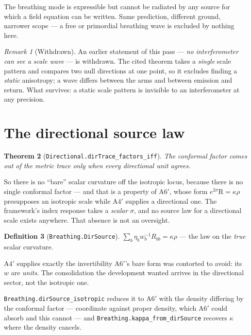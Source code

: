 \documentclass[11pt,a4paper]{article}
\newtheorem{theorem}{Theorem}[section]
\theoremstyle{definition}
\newtheorem{definition}[theorem]{Definition}
\theoremstyle{remark}
\newtheorem{remark}[theorem]{Remark}
\newcommand{\lean}[1]{\texttt{\small #1}}
\newcommand{\Rsc}{\mathrm{R}}
\newcommand{\sg}{\sigma}
\newcommand{\Ap}{\ensuremath{\mathrm{A6}'}}
\newcommand{\Afour}{\ensuremath{\mathrm{A4}'}}
\begin{document}
\begin{claimbox}
The breathing mode is expressible but cannot be radiated by any source for which a
field equation can be written. Same prediction, different ground, narrower scope
--- a free or primordial breathing wave is excluded by nothing here.
\end{claimbox}

\begin{remark}[Withdrawn]
An earlier statement of this pass --- \emph{no interferometer can see a scale wave}
--- is withdrawn. The cited theorem takes a \emph{single} scale pattern and
compares two null directions at one point, so it excludes finding a \emph{static}
anisotropy; a wave differs between the arms and between emission and return. What
survives: a static scale pattern is invisible to an interferometer at any
precision.
\end{remark}

\section{The directional source law}
\label{sec:dirlaw}

\begin{theorem}[\lean{Directional.dirTrace\_factors\_iff}]
The conformal factor comes out of the metric trace \emph{only} when every
directional unit agrees.
\end{theorem}

So there is no ``bare'' scalar curvature off the isotropic locus, because there is
no single conformal factor --- and that is a property of \Ap{}, whose form
$e^{2\sg}\Rsc=\kappa\rho$ presupposes an isotropic scale while \Afour{} supplies a
directional one. The framework's index response takes a \emph{scalar} $\sg$, and no
source law for a directional scale exists anywhere. That absence is not an
oversight.

\begin{definition}[\lean{Breathing.DirSource}]
$\sum_b\eta_b w_b^{-1}R_{bb}=\kappa\rho$ --- the law on the \emph{true} scalar
curvature.
\end{definition}

\begin{claimbox}
\Afour{} supplies exactly the invertibility \Ap{}'s bare form was contorted to
avoid: its $w$ are \emph{units}. The consolidation the development wanted arrives
in the directional sector, not the isotropic one.
\end{claimbox}

\lean{Breathing.dirSource\_isotropic} reduces it to \Ap{} with the density
differing by the conformal factor --- coordinate against proper density, which
\Ap{} could absorb and this cannot --- and \lean{Breathing.kappa\_from\_dirSource}
recovers $\kappa$ where the density cancels.
\end{document}
